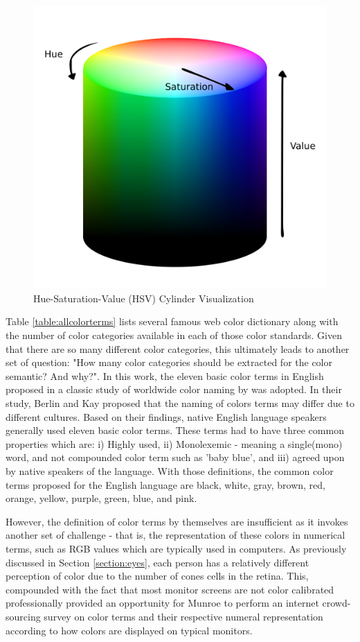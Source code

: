 \begin{figure}[hbt!]\centering
\includegraphics[width=.5\textwidth]{image/general/HSV.png}
\caption{Hue-Saturation-Value (HSV) Cylinder Visualization}
\label{fig:hsvcylinder}
\end{figure}



Table \ref{table:allcolorterms} lists several famous web color dictionary along with the number of color categories available in each of those color standards. Given that there are so many different color categories, this ultimately leads to another set of question: "How many color categories should be extracted for the color semantic? And why?". In this work, the eleven basic color terms in English proposed in a classic study of worldwide color naming by \cite{berlinandkay} was adopted. In their study, Berlin and Kay proposed that the naming of colors terms may differ due to different cultures. Based on their findings, native English language speakers generally used eleven basic color terms. These terms had to have three common properties which are: i) Highly used, ii) Monolexemic - meaning a single(mono) word, and not compounded color term such as 'baby blue', and iii) agreed upon by native speakers of the language. With those definitions, the common color terms proposed for the English language are black, white, gray, brown, red, orange, yellow, purple, green, blue, and pink. 

However, the definition of color terms by themselves are insufficient as it invokes another set of challenge - that is, the representation of these colors in numerical terms, such as RGB values which are typically used in computers. As previously discussed in Section \ref{section:eyes}, each person has a relatively different perception of color due to the number of cones cells in the retina. This, compounded with the fact that most monitor screens are not color calibrated professionally provided an opportunity for Munroe \cite{munroe2010color} to perform an internet crowd-sourcing survey on color terms and their respective numeral representation according to how colors are displayed on typical monitors.

